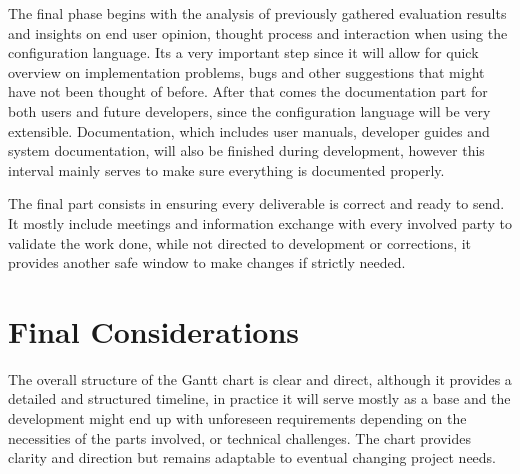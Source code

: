 The final phase begins with the analysis of previously gathered evaluation results and insights on end user opinion, thought process and interaction when using the configuration language. Its a very important step since it will allow for quick overview on implementation problems, bugs and other suggestions that might have not been thought of before. After that comes the documentation part for both users and future developers, since the configuration language will be very extensible. Documentation, which includes user manuals, developer guides and system documentation, will also be finished during development, however this interval mainly serves to make sure everything is documented properly.

The final part consists in ensuring every deliverable is correct and ready to send. It mostly include meetings and information exchange with every involved party to validate the work done, while not directed to development or corrections, it provides another safe window to make changes if strictly needed.

\section{Final Considerations}
\label{sec:dev_plan_final}

The overall structure of the Gantt chart is clear and direct, although it provides a detailed and structured timeline, in practice it will serve mostly as a base and the development might end up with unforeseen requirements depending on the necessities of the parts involved, or technical challenges. The chart provides clarity and direction but remains adaptable to eventual changing project needs.
